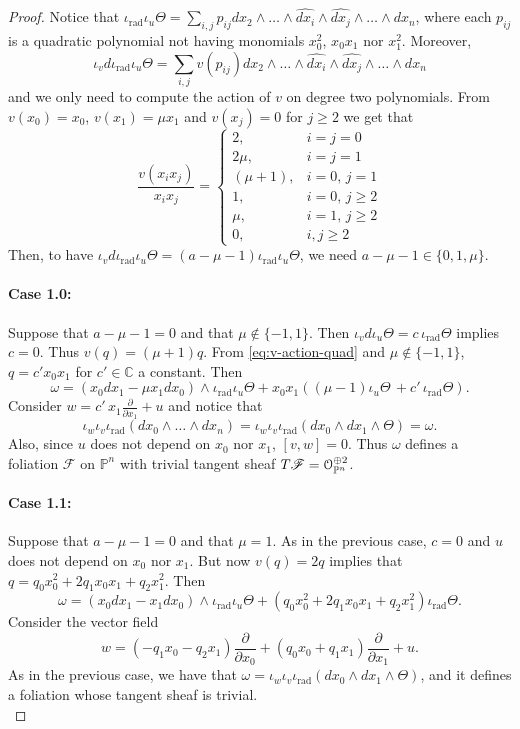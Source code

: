 \documentclass[twoside]{amsart}
\numberwithin{equation}{section}
\newcommand{\opn}{{\mathcal O}_{\mathbb{P}^{n}}}
\newcommand{\pn}{{\mathbb{P}^{n}}}
\DeclareMathOperator{\rad}{rad}
\def\CC{{\mathbb{C}}}
\newcommand{\sF}{\mathscr{F}}
\newcommand{\tF}{{\rm T}\sF}
\newcommand{\del}[1]{\frac{\partial}{\partial #1}}
\theoremstyle{definition}
\begin{document}
\begin{proof}
 Notice that $\iota_{\rad}\iota_u \Theta = \sum_{i,j} p_{ij} dx_2\wedge \dots \wedge \widehat{dx_i} \wedge \widehat{dx_j} \wedge \dots \wedge dx_n $, where each $p_{ij}$ is a quadratic polynomial not having monomials $x_0^2$, $x_0x_1$ nor $x_1^2$. Moreover,
 \[
 \iota_v d\iota_{\rad} \iota_u \Theta = \sum_{i,j} v( p_{ij} ) dx_2\wedge \dots \wedge \widehat{dx_i} \wedge \widehat{dx_j} \wedge \dots \wedge dx_n
 \]
 and we only need to compute the action of $v$ on degree two polynomials. From $v(x_0) = x_0$, $v(x_1) = \mu x_1$ and $v(x_j) = 0$ for $j\geq 2$ we get that 
 \begin{equation} \label{eq:v-action-quad}
 \frac{v(x_ix_j)}{x_ix_j} = \begin{cases} 2, & i=j = 0\\ 2\mu , & i=j=1\\
 (\mu+1) , &i = 0, \, j = 1 \\ 
 1, & i = 0, \, j\geq 2 \\ \mu ,& i = 1,\, j \geq 2 \\ 0 , & i,j\geq 2 
 \end{cases} 
 \end{equation}
 Then, to have $\iota_v d\iota_{\rad}\iota_u \Theta= (a - \mu - 1)\iota_{\rad}\iota_u \Theta$, we need $a-\mu-1\in \{ 0, 1, \mu \}$. 
\\
 \paragraph{\textbf{Case 1.0:}} Suppose that $a-\mu-1 = 0$ and that $\mu \not\in \{ -1,1\}$. Then $\iota_v d \iota_u \Theta = c \, \iota_{\rad} \Theta$ implies $c =0$. Thus $v(q) = (\mu+1)q$. From \eqref{eq:v-action-quad} and $\mu \not\in \{ -1,1\}$, $q = c' x_0x_1$ for $c'\in \CC$ a constant.
 Then 
 \[
 \omega = (x_0 dx_1 - \mu x_1 dx_0) \wedge \iota_{\rad}\iota_u \Theta + x_0x_1((\mu-1)\iota_u \Theta \, + c'\, \iota_{\rad}\Theta). 
 \]
 Consider $w = c'\, x_1 \del{ x_1} + u$ and notice that 
 \[
 \iota_w\iota_v\iota_{\rad} (dx_0\wedge \dots \wedge dx_n) = \iota_w\iota_v\iota_{\rad} (dx_0\wedge dx_1 \wedge \Theta) = \omega. 
 \]
 Also, since $u$ does not depend on $x_0$ nor $x_1$, $[v,w] =0$. Thus $\omega$ defines a foliation $\sF$ on $\pn$ with trivial tangent sheaf $\tF = \opn^{\oplus 2}$. 

 \paragraph{\textbf{Case 1.1:}} Suppose that $a-\mu-1 = 0$ and that $\mu =1$. As in the previous case, $c=0$ and $u$ does not depend on $x_0$ nor $x_1$. But now $v(q) = 2 q$ implies that $q = q_{0}x_0^2 + 2q_{1}x_0x_1+ q_{2}x_1^2$. Then
 \[
 \omega = (x_0 dx_1 - x_1 dx_0) \wedge \iota_{\rad}\iota_u \Theta + (q_{0}x_0^2 + 2q_{1}x_0x_1+ q_{2}x_1^2) \iota_{\rad}\Theta.
 \]
 Consider the vector field
 \[
 w = \left( -q_1x_0 -q_2 x_1 \right)\del{ x_0} + \left(q_0x_0 +q_1x_1 \right)\del{ x_1} + u.
 \]
 As in the previous case, we have that $ \omega = \iota_w \iota_v\iota_{\rad} (dx_0\wedge dx_1 \wedge \Theta) $, and it defines a foliation whose tangent sheaf is trivial.
\\

\end{proof}
\end{document}
